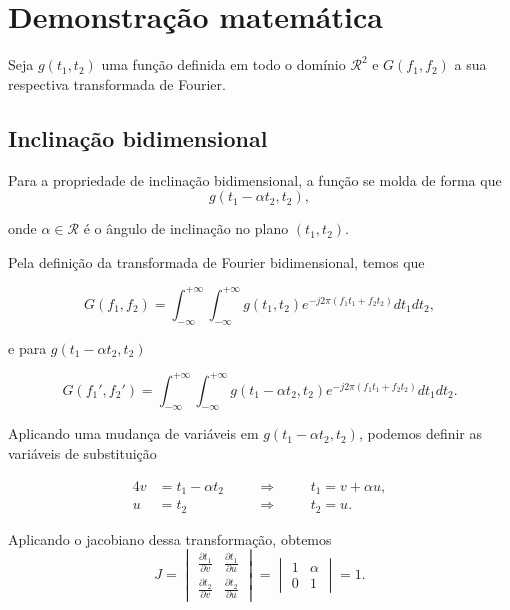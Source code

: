 \section{Demonstração matemática}

Seja $g(t_1,t_2)$ uma função definida em todo o domínio $\mathcal{R}^2$ 
e $G(f_1,f_2)$ a sua respectiva transformada de Fourier.

\subsection{Inclinação bidimensional}
Para a propriedade de inclinação bidimensional, a função se molda de forma que
\begin{equation*}
    g(t_1 - \alpha t_2, t_2),
\end{equation*}

\noindent
onde $\alpha \in \mathcal{R}$  é o ângulo de inclinação no plano $(t_1,t_2)$.

Pela definição da transformada de Fourier bidimensional, temos que

\begin{equation*}
    G(f_1,f_2) = \int_{-\infty}^{+\infty} \int_{-\infty}^{+\infty} {g(t_1,t_2)e^{-j2\pi (f_1t_1+f_2t_2)}}dt_1dt_2,
\end{equation*}

\noindent
e para $g(t_1 - \alpha t_2, t_2)$

\begin{equation*}
    G(f_1',f_2') = \int_{-\infty}^{+\infty} \int_{-\infty}^{+\infty} {g(t_1 - \alpha t_2,t_2)e^{-j2\pi (f_1t_1+f_2t_2)}}dt_1dt_2.
\end{equation*}

Aplicando uma mudança de variáveis em $g(t_1 - \alpha t_2, t_2)$, podemos definir as variáveis de substituição


\begin{alignat}{4}
    v & = t_1 - \alpha t_2 &\quad& \Longrightarrow &\quad& t_1 = v + \alpha u, \\
    u & = t_2               &\quad& \Longrightarrow &\quad& t_2 = u.
\end{alignat}



Aplicando o jacobiano dessa transformação, obtemos
\[
J = 
\begin{vmatrix}
\frac{\partial t_1}{\partial v} & \frac{\partial t_1}{\partial u} \\
\frac{\partial t_2}{\partial v} & \frac{\partial t_2}{\partial u}
\end{vmatrix}
=
\begin{vmatrix}
1 & \alpha \\
0 & 1
\end{vmatrix}
= 1.
\]

